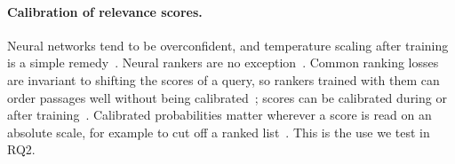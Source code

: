\paragraph{Calibration of relevance scores.}
Neural networks tend to be overconfident, and temperature scaling after training is a simple
remedy~\cite{Guo2017Calibration}. Neural rankers are no exception~\cite{Penha2021Calibration}. Common ranking losses
are invariant to shifting the scores of a query, so rankers trained with them can order passages well without being
calibrated~\cite{Penha2021Calibration,Yan2022ScaleCalibration}; scores can be calibrated during or after
training~\cite{Guo2017Calibration,Yu2025ExplainThenRank}. Calibrated probabilities matter wherever a score is read on
an absolute scale, for example to cut off a ranked list~\cite{Bahri2020Choppy}. This is the use we test in RQ2.

